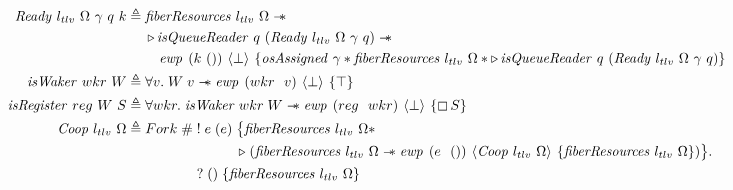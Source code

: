 \begin{figure}[ht]
    \begin{align*}
        \gsReadyF{}~l_{tlv}~\Omega~\gamma~q~k & \triangleq \begin{aligned}[t]
                                                         & \gsFiberResources{l_{tlv}}{\Omega} \wand                                                                                                           \\
                                                         & \later \gsIsQueueReader{}~q~(\gsReadyF{}~l_{tlv}~\Omega~\gamma~q) \wand                                                                                  \\
                                                         & \quad \ewp{k~()}{\bot}{\gspdone{\gamma} \ast \gsFiberResources{l_{tlv}}{\Omega} \ast \later \gsIsQueueReader{}~q~(\gsReadyF{}~l_{tlv}~\Omega~\gamma~q) }
                                                    \end{aligned} \\
        \gsIsWaker{}~wkr~W             & \triangleq \forall v.   \;  W\; v \wand{} \ewp{wkr\ \ v}{\bot}{\top}                                                                                                \\
        \gsIsRegF{}~reg~W~S             & \triangleq \forall wkr. \; \gsIsWaker{}\; wkr\; W \wand{} \ewp{reg\ \ wkr}{\bot}{\always S}                                                                         \\
        \protoF{}~l_{tlv}~\Omega              & \triangleq \begin{aligned}[t]
                                                        Fork\;       & \#\; \begin{aligned}[t]
                                     & !\; e\; (e)\; \begin{aligned}[t]
                                           & \big\{ \gsFiberResources{l_{tlv}}{\Omega} \ast                                                                              \\
                                           & \later\; (\gsFiberResources{l_{tlv}}{\Omega} \wand{} \ewp{e\ \ ()}{\protoF{}~l_{tlv}~\Omega}{\gsFiberResources{l_{tlv}}{\Omega}}) \big\} .
                                      \end{aligned} \\
                                     & ?\; ()\; \{ \gsFiberResources{l_{tlv}}{\Omega} \}
                                \end{aligned}                                             \\

\end{aligned}
\end{align*}
\end{figure}
